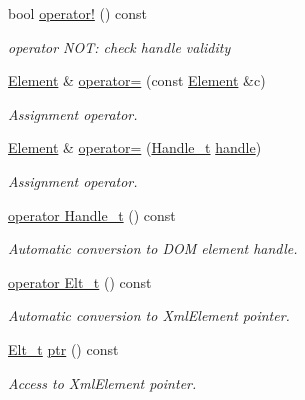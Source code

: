 \begin{DoxyCompactItemize}
bool \hyperlink{class_d_d4hep_1_1_x_m_l_1_1_element_a2db5e6db2748494610fb5da2b71c5f2f}{operator!} () const
\begin{DoxyCompactList}\small\item\em operator N\+OT\+: check handle validity \end{DoxyCompactList}\item 
\hyperlink{class_d_d4hep_1_1_x_m_l_1_1_element}{Element} \& \hyperlink{class_d_d4hep_1_1_x_m_l_1_1_element_afa8ba01485168c3492bd913c22bc8c0d}{operator=} (const \hyperlink{class_d_d4hep_1_1_x_m_l_1_1_element}{Element} \&c)
\begin{DoxyCompactList}\small\item\em Assignment operator. \end{DoxyCompactList}\item 
\hyperlink{class_d_d4hep_1_1_x_m_l_1_1_element}{Element} \& \hyperlink{class_d_d4hep_1_1_x_m_l_1_1_element_a223f10555b456157ff26eb457a9e40e5}{operator=} (\hyperlink{class_d_d4hep_1_1_x_m_l_1_1_handle__t}{Handle\+\_\+t} \hyperlink{_geant4_converter_8cpp_a3789cd8800e1433fb917a1d6f85ef67d}{handle})
\begin{DoxyCompactList}\small\item\em Assignment operator. \end{DoxyCompactList}\item 
\hyperlink{class_d_d4hep_1_1_x_m_l_1_1_element_ae0d9a6dcfa82e3339d7fb1dc7b42ef6d}{operator Handle\+\_\+t} () const
\begin{DoxyCompactList}\small\item\em Automatic conversion to D\+OM element handle. \end{DoxyCompactList}\item 
\hyperlink{class_d_d4hep_1_1_x_m_l_1_1_element_af983694ddf6cc41c83a6e43ed5cec266}{operator Elt\+\_\+t} () const
\begin{DoxyCompactList}\small\item\em Automatic conversion to Xml\+Element pointer. \end{DoxyCompactList}\item 
\hyperlink{class_d_d4hep_1_1_x_m_l_1_1_element_af63782f6873c3d8c9b28e1777cde9275}{Elt\+\_\+t} \hyperlink{class_d_d4hep_1_1_x_m_l_1_1_element_a990d7d1d7a5343fb69bc46e0a8eca94a}{ptr} () const
\begin{DoxyCompactList}\small\item\em Access to Xml\+Element pointer. \end{DoxyCompactList}\item 

\end{DoxyCompactItemize}
